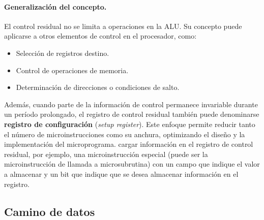 \paragraph{Generalización del concepto.} 
El control residual no se limita a operaciones en la ALU. Su concepto puede aplicarse a otros elementos de control en el procesador, como:
\begin{itemize}
    \item Selección de registros destino.
    \item Control de operaciones de memoria.
    \item Determinación de direcciones o condiciones de salto.
\end{itemize}

Además, cuando parte de la información de control permanece invariable durante un período prolongado, el registro de control residual también puede denominarse \textbf{registro de configuración} (\textit{setup register}). Este enfoque permite reducir tanto el número de microinstrucciones como su anchura, optimizando el diseño y la implementación del microprograma.
cargar información en el registro de control residual, por ejemplo, una microinstrucción especial (puede ser la microinstrucción de llamada a microsubrutina) con un campo que indique el valor a almacenar y un bit que indique que se desea almacenar información en el registro.
\subsection{Camino de datos}
